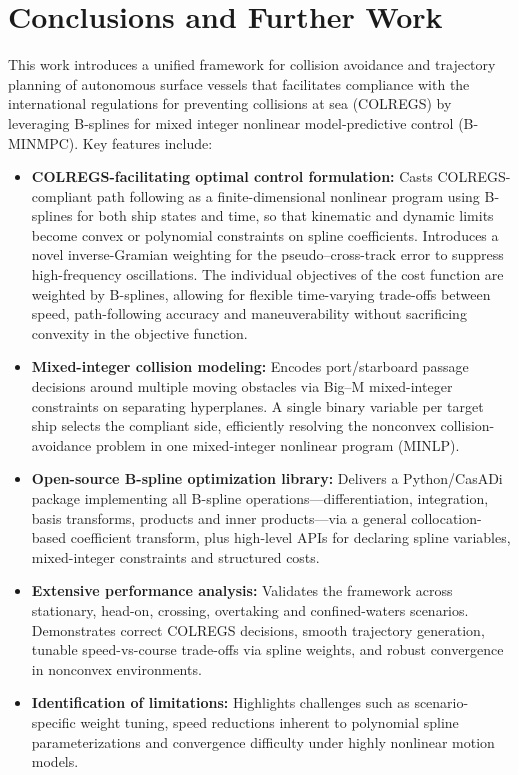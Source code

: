 
\chapter{Conclusions and Further Work}
\label{chap:conclusions}

This work introduces a unified framework for collision avoidance and trajectory planning of autonomous surface vessels that facilitates compliance with the international regulations for preventing collisions at sea (COLREGS) by leveraging B‐splines for mixed integer nonlinear model‐predictive control (B-MINMPC).  Key features include:

\begin{itemize}
    \item \textbf{COLREGS-facilitating optimal control formulation:}  Casts COLREGS-compliant path following as a finite-dimensional nonlinear program using B-splines for both ship states and time, so that kinematic and dynamic limits become convex or polynomial constraints on spline coefficients. Introduces a novel inverse-Gramian weighting for the pseudo–cross-track error to suppress high-frequency oscillations. The individual objectives of the cost function are weighted by B-splines, allowing for flexible time-varying trade-offs between speed, path-following accuracy and maneuverability without sacrificing convexity in the objective function.

    \item \textbf{Mixed-integer collision modeling:}  Encodes port/starboard passage decisions around multiple moving obstacles via Big–M mixed-integer constraints on separating hyperplanes. A single binary variable per target ship selects the compliant side, efficiently resolving the nonconvex collision-avoidance problem in one mixed-integer nonlinear program (MINLP).

    \item \textbf{Open-source B-spline optimization library:}  Delivers a Python/CasADi package implementing all B-spline operations---differentiation, integration, basis transforms, products and inner products---via a general collocation-based coefficient transform, plus high-level APIs for declaring spline variables, mixed-integer constraints and structured costs.

    \item \textbf{Extensive performance analysis:}  Validates the framework across stationary, head-on, crossing, overtaking and confined-waters scenarios. Demonstrates correct COLREGS decisions, smooth trajectory generation, tunable speed-vs-course trade-offs via spline weights, and robust convergence in nonconvex environments. 

    \item \textbf{Identification of limitations:}  Highlights challenges such as scenario-specific weight tuning, speed reductions inherent to polynomial spline parameterizations and convergence difficulty under highly nonlinear motion models. 
\end{itemize}


